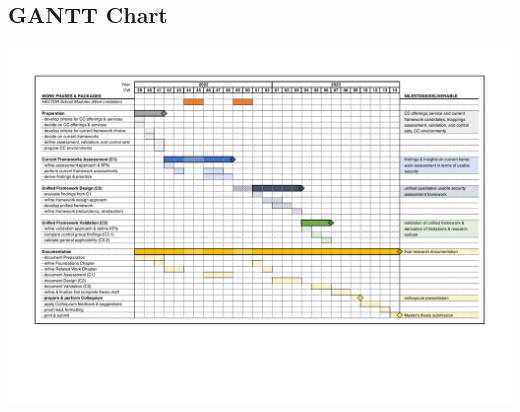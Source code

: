 	\subsection{GANTT Chart} \label{subs:organization-work-gantt}
	\begin{center}
		\vfill
		\includegraphics[angle=90,scale=0.58]{content/2-research-proposal/img/gantt.pdf}
		\vfill
	\end{center}
	\newpage